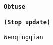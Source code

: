 \documentclass[11pt,twoside]{ctexbook}
\begin{document}

\fancyhead[RE]{\Subsectionname}
\fancyhead[OL]{\Sectionname}
\fancyfoot[RE]{\leftmark}
\fancyfoot[CO,CE]{}

\begin{titlepage}
	\begin{center}
	  	\quad
  
	  	\vspace{.2\textheight}
	 	\huge\textbf{\tt Obtuse}
		
		\vspace{2ex}
		\textbf{\tt (Stop update)}
	 	
		\vspace{2ex}
	  	\normalsize {\tt Wenqingqian}
  
 
	\end{center}
\end{titlepage}
\let\cleardoublepage\clearpage
\thispagestyle{empty}
\end{document}
